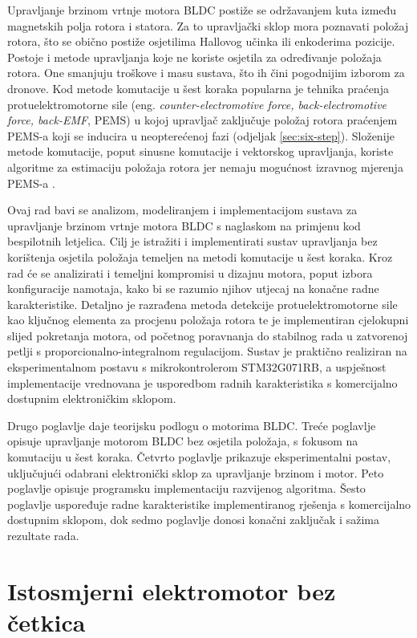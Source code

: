 \documentclass[diplomskirad, upload]{fer}
\begin{document}
Upravljanje brzinom vrtnje motora BLDC postiže se održavanjem kuta između
magnetskih polja rotora i statora. Za to upravljački sklop mora poznavati
položaj rotora, što se obično postiže osjetilima Hallovog učinka ili enkoderima
pozicije. Postoje i metode upravljanja koje ne koriste osjetila za određivanje
položaja rotora. One smanjuju troškove i masu sustava, što ih čini pogodnijim
izborom za dronove. Kod metode komutacije u šest koraka popularna je tehnika
praćenja protuelektromotorne sile (eng. \textit {counter-electromotive force,
	back-electromotive force, back-EMF}, PEMS) u kojoj upravljač zaključuje položaj
rotora praćenjem PEMS-a koji se inducira u neopterećenoj fazi (odjeljak
\ref{sec:six-step}). Složenije metode komutacije, poput sinusne komutacije i
vektorskog upravljanja, koriste algoritme za estimaciju položaja rotora jer
nemaju mogućnost izravnog mjerenja PEMS-a \cite{NXP_AN2355}.


Ovaj rad bavi se analizom, modeliranjem i implementacijom sustava za
upravljanje brzinom vrtnje motora BLDC s naglaskom na primjenu kod bespilotnih
letjelica. Cilj je istražiti i implementirati sustav upravljanja bez korištenja
osjetila položaja temeljen na metodi komutacije u šest koraka. Kroz rad će se
analizirati i temeljni kompromisi u dizajnu motora, poput izbora konfiguracije
namotaja, kako bi se razumio njihov utjecaj na konačne radne karakteristike.
Detaljno je razrađena metoda detekcije protuelektromotorne sile kao ključnog
elementa za procjenu položaja rotora te je implementiran cjelokupni slijed
pokretanja motora, od početnog poravnanja do stabilnog rada u zatvorenoj petlji
s proporcionalno-integralnom regulacijom. Sustav je praktično realiziran na
eksperimentalnom postavu s mikrokontrolerom STM32G071RB, a uspješnost
implementacije vrednovana je usporedbom radnih karakteristika s komercijalno
dostupnim elektroničkim sklopom.

Drugo poglavlje daje teorijsku podlogu o motorima BLDC. Treće poglavlje opisuje
upravljanje motorom BLDC bez osjetila položaja, s fokusom na komutaciju u šest
koraka. Četvrto poglavlje prikazuje eksperimentalni postav, uključujući
odabrani elektronički sklop za upravljanje brzinom i motor. Peto poglavlje
opisuje programsku implementaciju razvijenog algoritma. Šesto poglavlje
uspoređuje radne karakteristike implementiranog rješenja s komercijalno
dostupnim sklopom, dok sedmo poglavlje donosi konačni zaključak i sažima
rezultate rada.
\chapter{Istosmjerni elektromotor bez četkica}
\label{pog:bldc}
\end{document}

